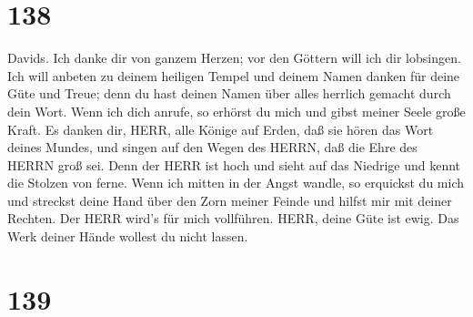 \hypertarget{section-137}{%
\section{138}\label{section-137}}

 Davids. Ich danke dir von ganzem Herzen; vor den Göttern
will ich dir lobsingen.  Ich will anbeten zu deinem heiligen
Tempel und deinem Namen danken für deine Güte und Treue; denn du hast
deinen Namen über alles herrlich gemacht durch dein Wort. 
Wenn ich dich anrufe, so erhörst du mich und gibst meiner Seele große
Kraft.  Es danken dir, HERR, alle Könige auf Erden, daß sie
hören das Wort deines Mundes,  und singen auf den Wegen des
HERRN, daß die Ehre des HERRN groß sei.  Denn der HERR ist
hoch und sieht auf das Niedrige und kennt die Stolzen von ferne.
 Wenn ich mitten in der Angst wandle, so erquickst du mich
und streckst deine Hand über den Zorn meiner Feinde und hilfst mir mit
deiner Rechten.  Der HERR wird's für mich vollführen. HERR,
deine Güte ist ewig. Das Werk deiner Hände wollest du nicht lassen.

\hypertarget{section-138}{%
\section{139}\label{section-138}}

